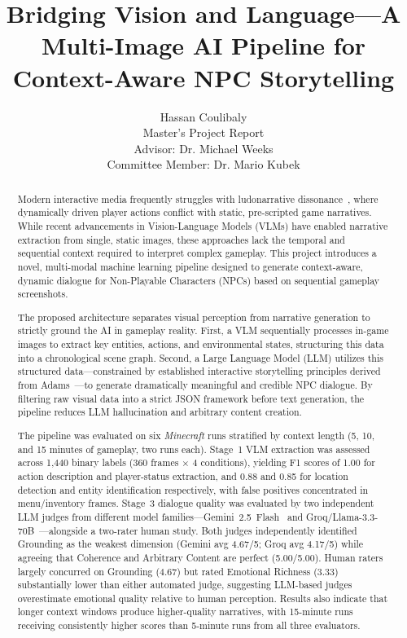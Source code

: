 \documentclass[11pt]{article}
\title{Bridging Vision and Language---A Multi-Image AI Pipeline for Context-Aware NPC Storytelling}
\author{
  Hassan Coulibaly \\
  Master's Project Report \\
  Advisor: Dr. Michael Weeks \\
  Committee Member: Dr. Mario Kubek
}
\begin{document}
\maketitle

\begin{abstract}
Modern interactive media frequently struggles with ludonarrative dissonance~\cite{Hocking2007}, where dynamically driven player actions conflict with static, pre-scripted game narratives. While recent advancements in Vision-Language Models (VLMs) have enabled narrative extraction from single, static images, these approaches lack the temporal and sequential context required to interpret complex gameplay. This project introduces a novel, multi-modal machine learning pipeline designed to generate context-aware, dynamic dialogue for Non-Playable Characters (NPCs) based on sequential gameplay screenshots.

The proposed architecture separates visual perception from narrative generation to strictly ground the AI in gameplay reality. First, a VLM sequentially processes in-game images to extract key entities, actions, and environmental states, structuring this data into a chronological scene graph. Second, a Large Language Model (LLM) utilizes this structured data---constrained by established interactive storytelling principles derived from Adams~\cite{Adams2014}---to generate dramatically meaningful and credible NPC dialogue. By filtering raw visual data into a strict JSON framework before text generation, the pipeline reduces LLM hallucination and arbitrary content creation.

The pipeline was evaluated on six \emph{Minecraft} runs stratified by context length (5, 10, and 15 minutes of gameplay, two runs each). Stage~1 VLM extraction was assessed across 1{,}440 binary labels (360 frames $\times$ 4 conditions), yielding F1 scores of 1.00 for action description and player-status extraction, and 0.88 and 0.85 for location detection and entity identification respectively, with false positives concentrated in menu/inventory frames. Stage~3 dialogue quality was evaluated by two independent LLM judges from different model families---Gemini~2.5~Flash~\cite{GeminiTeam2024b} and Groq/Llama-3.3-70B~\cite{Dubey2024}---alongside a two-rater human study. Both judges independently identified Grounding as the weakest dimension (Gemini avg 4.67/5; Groq avg 4.17/5) while agreeing that Coherence and Arbitrary Content are perfect (5.00/5.00). Human raters largely concurred on Grounding (4.67) but rated Emotional Richness (3.33) substantially lower than either automated judge, suggesting LLM-based judges overestimate emotional quality relative to human perception. Results also indicate that longer context windows produce higher-quality narratives, with 15-minute runs receiving consistently higher scores than 5-minute runs from all three evaluators.
\end{abstract}
\end{document}
